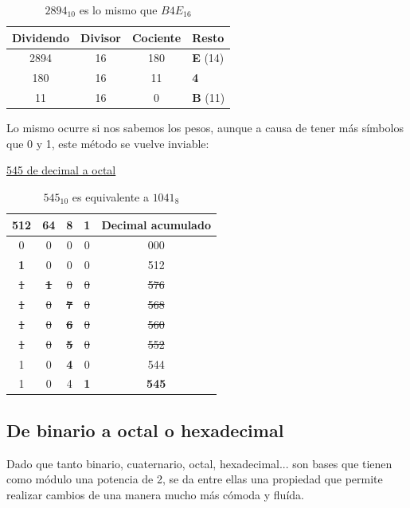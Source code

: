 \documentclass[12pt]{article}
\begin{document}
				\begin{table}[H]
					\centering
					\begin{tabular}{cccl}
						Dividendo & Divisor & Cociente & \textbf{Resto} \\
						\toprule
						2894 & 16 & 180 & \textbf{E} (14)\\
						180 & 16 & 11 & \textbf{4} \\
						\midrule
						11 & 16 & 0 & \textbf{B} (11) \\
					\end{tabular}
					\caption*{$2894_{10}$ es lo mismo que $B4E_{16}$}
				\end{table}
				
				Lo mismo ocurre si nos sabemos los pesos, aunque a causa de tener más símbolos que 0 y 1, este método se vuelve inviable:\\
				
				\begin{table}[H]
							\centering
							\caption*{\underline{545 de decimal a octal}}
							\begin{tabular}{cccc||c}
								\toprule
								512 & 64 & 8 & 1 & Decimal acumulado \\
								\midrule
								0 & 0 & 0 & 0 & 000 \\
								\textbf{1} & 0 & 0 & 0 & 512 \\
								\st{1}&\st{\textbf{1}}&\st{0}&\st{0}&\st{576} \\
								\st{1}&\st{0}&\st{\textbf{7}}&\st{0}&\st{568} \\
								\st{1}&\st{0}&\st{\textbf{6}}&\st{0}&\st{560} \\
								\st{1}&\st{0}&\st{\textbf{5}}&\st{0}&\st{552} \\
								1 & 0 & \textbf{4} & 0 & 544\\
								1 & 0 & 4 & \textbf{1} & \textbf{545}\\
								\bottomrule
							\end{tabular}
							\caption*{$545_{10}$ es equivalente a $1041_8$}
						\end{table}
						
						\newpage
						
			\subsection{De binario a octal o hexadecimal}
				
				Dado que tanto binario, cuaternario, octal, hexadecimal... son bases que tienen como módulo una potencia de 2, se da entre ellas una propiedad que permite realizar cambios de una manera mucho más cómoda y fluída.\\
				
\end{document}
